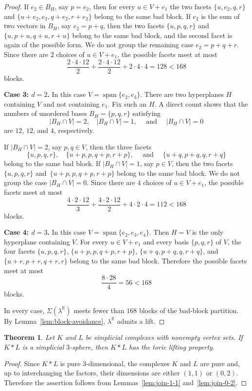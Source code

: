 \documentclass{amsart}
\newcommand{\R}{\mathbb{R}}
\DeclareMathOperator{\Span}{span}
\newtheorem{theorem}{Theorem}[section]
\theoremstyle{definition}
\theoremstyle{remark}
\begin{document}
\begin{proof}
    If $e_2\in B_H$, say $p=e_2$, then for every $u\in V+e_1$ the two facets $\{u,e_2,q,r\}$ and $\{u+e_2,e_2,q+e_2,r+e_2\}$ belong to the same bad block.
    If $e_2$ is the sum of two vectors in $B_H$, say $e_2=p+q$, then the two facets $\{u,p,q,r\}$ and $\{u,p+u,q+u,r+u\}$ belong to the same bad block, and the second facet is again of the possible form.
    We do not group the remaining case $e_2=p+q+r$.
    Since there are $2$ choices of $u\in V+e_1$, the possible facets meet at most
    $$
        \frac{2\cdot4\cdot12}{2} +\frac{2\cdot4\cdot12}{2} +2\cdot4\cdot4  =128<168
    $$
    blocks.

    \noindent\textsf{\textbf{Case 3: $d=2$.}}
    In this case $V=\Span\{e_2,e_3\}$.
    There are two hyperplanes $H$ containing $V$ and not containing $e_1$.
    Fix such an $H$.
    A direct count shows that the numbers of unordered bases $B_H=\{p,q,r\}$ satisfying
    $$
        |B_H\cap V|=2, \quad |B_H\cap V|=1, \quad \text{ and } \quad  |B_H\cap V|=0
    $$
    are $12$, $12$, and $4$, respectively.

    If $|B_H\cap V|=2$, say $p,q\in V$, then the three facets
    $$
        \{u,p,q,r\}, \quad  \{u+p,p,q+p,r+p\}, \quad \text{ and } \quad \{u+q,p+q,q,r+q\}
    $$
    belong to the same bad block.
    If $|B_H\cap V|=1$, say $p\in V$, then the two facets~$\{u,p,q,r\}$ and~$\{u+p,p,q+p,r+p\}$ belong to the same bad block.
    We do not group the case $|B_H\cap V|=0$.
    Since there are $4$ choices of $u\in V+e_1$, the possible facets meet at most
    $$
        \frac{4\cdot2\cdot12}{3} +\frac{4\cdot2\cdot12}{2} +4\cdot2\cdot4 =112<168
    $$
    blocks.

    \noindent\textsf{\textbf{Case 4: $d=3$.}}
    In this case $V=\Span\{e_2,e_3,e_4\}$.
    Then $H=V$ is the only hyperplane containing $V$.
    For every $u\in V+e_1$ and every basis $\{p,q,r\}$ of $V$, the four facets $\{u,p,q,r\}$, $\{u+p,p,q+p,r+p\}$, $\{u+q,p+q,q,r+q\}$, and $\{u+r,p+r,q+r,r\}$ belong to the same bad block.
    Therefore the possible facets meet at most
    $$
        \frac{8\cdot28}{4}=56<168
    $$
    blocks.

    In every case, $\Sigma(\lambda^\R)$ meets fewer than $168$ blocks of the bad-block partition.
    By Lemma~\ref{lem:block-avoidance}, $\lambda^\R$ admits a lift.
\end{proof}

\begin{theorem}\label{thm:join-type-3-spheres}
    Let $K$ and $L$ be simplicial complexes with nonempty vertex sets.
    If $K\ast L$ is a simplicial $3$-sphere, then $K\ast L$ has the toric lifting property.
\end{theorem}
\begin{proof}
    Since $K\ast L$ is pure $3$-dimensional, the complexes $K$ and $L$ are pure and, up to interchanging the factors, their dimensions are either $(1,1)$ or $(0,2)$. 
    Therefore the assertion follows from Lemmas~\ref{lem:join-1-1} and~\ref{lem:join-0-2}.
\end{proof}
\end{document}
